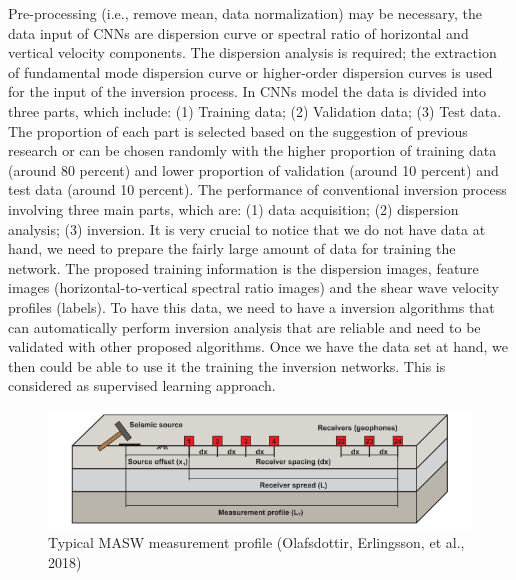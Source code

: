 Pre-processing (i.e., remove mean, data normalization) may be necessary, the data input of CNNs are dispersion curve or spectral ratio of horizontal and vertical velocity components. The dispersion analysis is required; the extraction of fundamental mode dispersion curve or higher-order dispersion curves is used for the input of the inversion process. In CNNs model the data is divided into three parts, which include:
(1) Training data;
(2) Validation data;
(3) Test data.
The proportion of each part is selected based on the suggestion of previous research or can be chosen randomly with the higher proportion of training data (around 80 percent) and lower proportion of validation (around 10 percent) and test data (around 10 percent). The performance of conventional inversion process involving three main parts, which are:
(1) data acquisition; 
(2) dispersion analysis;  
(3) inversion.
It is very crucial to notice that we do not have data at hand, we need to prepare the fairly large amount of data for training the network. The proposed training information is the dispersion images, feature images (horizontal-to-vertical spectral ratio images) and the shear wave velocity profiles (labels). To have this data, we need to have a inversion algorithms that can automatically perform inversion analysis that are reliable and need to be validated with other proposed algorithms. Once we have the data set at hand, we then could be able to use it the training the inversion networks. This is considered as supervised learning approach.

\begin{figure}[!t]
    \centering
    \includegraphics[scale=0.6]{images/geophoneconfig.png}
    \caption{Typical MASW measurement profile (Olafsdottir, Erlingsson, et al., 2018)}
    \label{fig:igeophoneconfig}
\end{figure}


